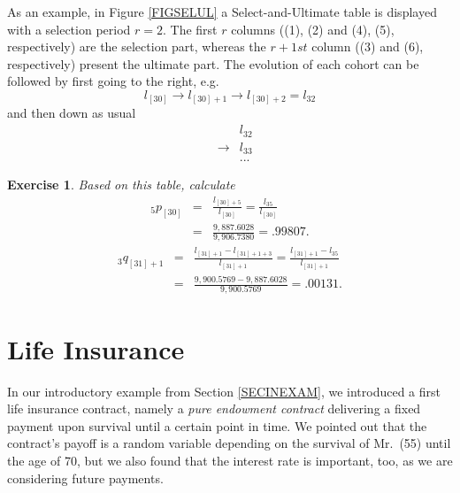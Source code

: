 \documentclass[11pt,fleqn,oneside]{book}
\newtheorem{exercise}{Exercise}
\begin{document}
As an example, in Figure \ref{FIGSELUL} a Select-and-Ultimate table is displayed with a selection period $r=2$. The first $r$ columns ((1), (2) and (4), (5), respectively) are the selection part, whereas the $r+1st$ column ((3) and (6), respectively) present the ultimate part. The evolution of each cohort can be followed by first going to the right, e.g.
$$
l_{[30]} \rightarrow l_{[30]+1} \rightarrow l_{[30]+2} = l_{32}
$$
and then down as usual
\begin{eqnarray*}
&& l_{32}\\
&\rightarrow& l_{33} \\
&&...
\end{eqnarray*}

\begin{exercise}
Based on this table, calculate
\begin{eqnarray*}
{_5p_{[30]}} &=& \frac{l_{[30]+5}}{l_{[30]}} = \frac{l_{35}}{l_{[30]}} \\
&=& \frac{9,887.6028}{9,906.7380} = .99807.
\end{eqnarray*}
\begin{eqnarray*}
{_3q_{[31]+1}} &=& \frac{l_{[31]+1} - l_{[31]+1+3}}{l_{[31]+1}} =\frac{l_{[31]+1} - l_{35}}{l_{[31]+1}}\\
&=& \frac{9,900.5769 - 9,887.6028}{9,900.5769} = .00131.
\end{eqnarray*}
\end{exercise}

\chapter{Life Insurance}
\label{CHAPLIFEINSURANCE}

In our introductory example from Section \ref{SECINEXAM}, we introduced a first life insurance contract, namely a \textit{pure endowment contract} delivering a fixed payment upon survival until a certain point in time. We pointed out that the contract's payoff is a random variable depending on the survival of Mr.\ (55) until the age of 70,  but we also found that the interest rate is important, too, as we are considering future payments.
\end{document}
